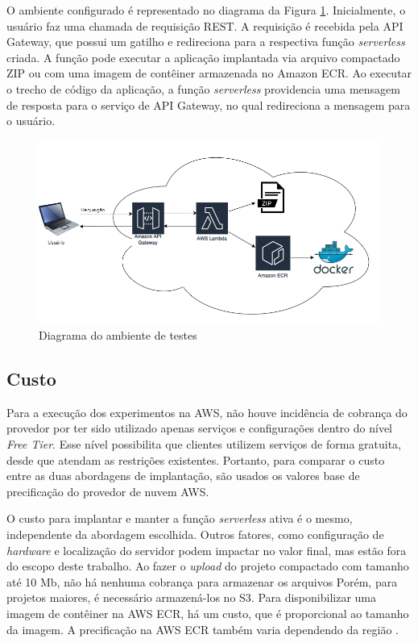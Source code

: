 \documentclass[conference]{IEEEtran}
\begin{document}
O ambiente configurado é representado no diagrama da Figura \ref{fig:env_diagram}. Inicialmente, o usuário faz uma chamada de requisição REST. A requisição é recebida pela API Gateway, que possui um gatilho e redireciona para a respectiva função \textit{serverless} criada. A função pode executar a aplicação implantada via arquivo compactado ZIP ou com uma imagem de contêiner armazenada no Amazon ECR. Ao executar o trecho de código da aplicação, a função \textit{serverless} providencia uma mensagem de resposta para o serviço de API Gateway, no qual redireciona a mensagem para o usuário.

\begin{figure}[H]
    \centering 
    \includegraphics [width=\linewidth]{images/environment-diagram-PT.png}
    \par
    \caption{Diagrama do ambiente de testes}
    \label{fig:env_diagram}
\end{figure}

\subsection{Custo}
\label{subsec:cost}

Para a execução dos experimentos na AWS, não houve incidência de cobrança do provedor por ter sido utilizado apenas serviços e configurações dentro do nível \textit{Free Tier}. Esse nível possibilita que clientes utilizem serviços de forma gratuita, desde que atendam as restrições existentes. Portanto, para comparar o custo entre as duas abordagens de implantação, são usados os valores base de precificação do provedor de nuvem AWS.

O custo para implantar e manter a função \textit{serverless} ativa é o mesmo, independente da abordagem escolhida. Outros fatores, como configuração de \textit{hardware} e localização do servidor podem impactar no valor final, mas estão fora do escopo deste trabalho.
Ao fazer o \textit{upload} do projeto compactado com tamanho até 10 Mb, não há nenhuma cobrança para armazenar os arquivos Porém, para projetos maiores, é necessário armazená-los no S3. Para disponibilizar uma imagem de contêiner na AWS ECR, há um custo, que é proporcional ao tamanho da imagem. A precificação na AWS ECR também varia dependendo da região \cite{aws_2023_ecr_pricing}. 
\end{document}

